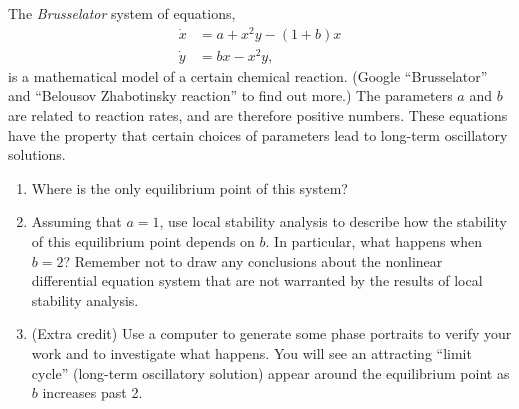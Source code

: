 \documentclass[12pt,letterpaper]{hmcpset}
\begin{document}
\begin{problem}[4]
    The \textit{Brusselator} system of equations,
    \begin{align*}
        \dot{x}&=a+x^2y-(1+b)x\\
        \dot{y}&=bx-x^2y,
    \end{align*}
    is a mathematical model of a certain chemical reaction.  (Google
    ``Brusselator'' and ``Belousov Zhabotinsky reaction'' to find out
    more.)  The parameters $a$ and $b$ are related to reaction rates,
    and are therefore positive numbers.  These equations have the
    property that certain choices of parameters lead to long-term
    oscillatory solutions.
    \begin{enumerate}
        \item Where is the only equilibrium point of this system?
        \item Assuming that $a=1$, use local stability analysis to
            describe how the stability of this equilibrium point depends
            on $b$.  In particular, what happens when $b=2$?  Remember
            not to draw any conclusions about the nonlinear differential
            equation system that are not warranted by the results of
            local stability analysis.
        \item (Extra credit) Use a computer to generate some phase portraits
            to verify your work and to investigate what happens.  You will see
            an attracting ``limit cycle'' (long-term oscillatory solution)
            appear around the equilibrium point as $b$ increases past 2.
    \end{enumerate}
\end{problem}
\begin{solution}
    \vfill
\end{solution}
\newpage
\end{document}
